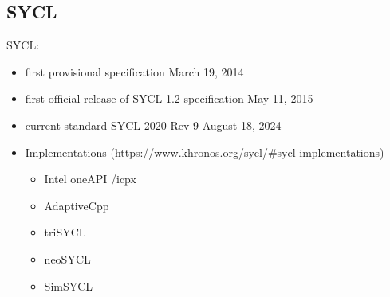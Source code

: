 \subsection{SYCL}

SYCL:
\begin{itemize}
    \item first provisional specification March 19, 2014~\cite{khronos_sycl_working_group_khronos_2014}
    \item first official release of SYCL 1.2 specification May 11, 2015~\cite{khronos_sycl_working_group_khronos_2015}
    \item current standard SYCL 2020 Rev 9 August 18, 2024~\cite{khronos_sycl_working_group_sycl_2024}
    \item Implementations (\url{https://www.khronos.org/sycl/#sycl-implementations})
    \begin{itemize}
        \item Intel oneAPI \dpcpp/icpx
        \item AdaptiveCpp
        \item triSYCL
        \item neoSYCL
        \item SimSYCL
    \end{itemize}
\end{itemize}